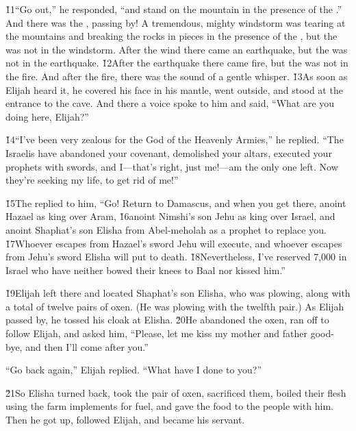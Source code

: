 \v{11}``Go out,'' he responded, ``and stand on the mountain in the presence of the .'' And there was the , passing by! A tremendous, mighty windstorm was tearing at the mountains and breaking the rocks in pieces in the presence of the , but the  was not in the windstorm. After the wind there came an earthquake, but the  was not in the earthquake. \v{12}After the earthquake there came fire, but the  was not in the fire. And after the fire, there was the sound of a gentle whisper. \v{13}As soon as Elijah heard it, he covered his face in his mantle, went outside, and stood at the entrance to the cave. And there a voice spoke to him and said, ``What are you doing here, Elijah?''

\v{14}``I've been very zealous for the  God of the Heavenly Armies,'' he replied. ``The Israelis have abandoned your covenant, demolished your altars, executed your prophets with swords, and I---that's right, just me!---am the only one left. Now they're seeking my life, to get rid of me!''

\v{15}The  replied to him, ``Go! Return to Damascus, and when you get there, anoint Hazael as king over Aram, \v{16}anoint Nimshi's son Jehu as king over Israel, and anoint Shaphat's son Elisha from Abel-meholah as a prophet to replace you. \v{17}Whoever escapes from Hazael's sword Jehu will execute, and whoever escapes from Jehu's sword Elisha will put to death. \v{18}Nevertheless, I've reserved 7,000 in Israel who have neither bowed their knees to Baal nor kissed him.''

\v{19}Elijah left there and located Shaphat's son Elisha, who was plowing, along with a total of twelve pairs of oxen. (He was plowing with the twelfth pair.) As Elijah passed by, he tossed his cloak at Elisha. \v{20}He abandoned the oxen, ran off to follow Elijah, and asked him, ``Please, let me kiss my mother and father good-bye, and then I'll come after you.''

``Go back again,'' Elijah replied. ``What have I done to you?''

\v{21}So Elisha turned back, took the pair of oxen, sacrificed them, boiled their flesh using the farm implements for fuel, and gave the food to the people with him. Then he got up, followed Elijah, and became his servant.

